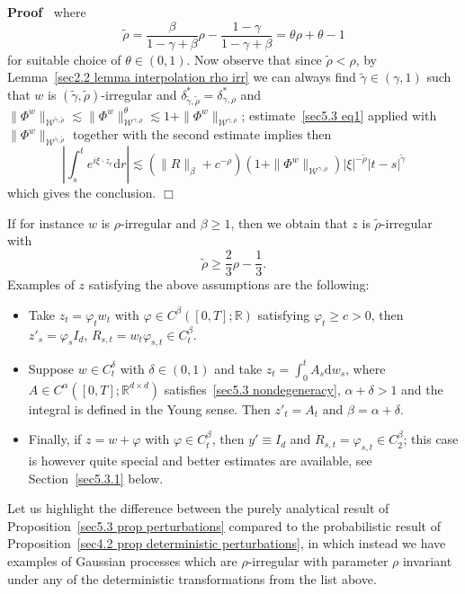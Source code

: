 \documentclass[10pt]{article}
\newcommand{\comma}{{,}}
\newcommand{\mathd}{\mathrm{d}}
\newenvironment{proof}{\noindent\textbf{Proof\ }}{\hspace*{\fill}$\Box$\medskip}
\begin{document}
\begin{proof}
  where
  \[ \tilde{\rho} = \frac{\beta}{1 - \gamma + \beta} \rho - \frac{1 -
     \gamma}{1 - \gamma + \beta} = \theta \rho + \theta - 1 \]
  for suitable choice of $\theta \in (0, 1)$. Now observe that since
  $\tilde{\rho} < \rho$, by Lemma~\ref{sec2.2 lemma interpolation rho irr} we
  can always find $\tilde{\gamma} \in (\gamma, 1)$ such that $w$ is
  $(\tilde{\gamma}, \tilde{\rho})$\mbox{-}irregular and
  $\delta^{\ast}_{\tilde{\gamma}, \tilde{\rho}} = \delta^{\ast}_{\gamma,
  \rho}$ and $\| \Phi^w \|_{\mathcal{W}^{\tilde{\gamma}, \tilde{\rho}}}
  \lesssim \| \Phi^w \|_{\mathcal{W}^{\gamma \comma \rho}}^{\theta} \lesssim 1
  + \| \Phi^w \|_{\mathcal{W}^{\gamma, \rho}}$; estimate~{\eqref{sec5.3 eq1}}
  applied with $\| \Phi^w \|_{\mathcal{W}^{\tilde{\gamma}, \tilde{\rho}}}$
  together with the second estimate implies then
  \[ \left| \int_s^t e^{i \xi \cdot z_r} \mathd r \right| \lesssim (\| R
     \|_{\beta} + c^{- \rho}) (1 + \| \Phi^w \|_{\mathcal{W}^{\gamma, \rho}})
     | \xi |^{- \tilde{\rho}} | t - s |^{\tilde{\gamma}} \]
  which gives the conclusion.
\end{proof}

\begin{remark}
  \label{sec5.3 remark examples}If for instance $w$ is $\rho$\mbox{-}irregular
  and $\beta \geqslant 1$, then we obtain that $z$ is
  $\tilde{\rho}$\mbox{-}irregular with
  \[ \tilde{\rho} \geqslant \frac{2}{3} \rho - \frac{1}{3} . \]
  Examples of $z$ satisfying the above assumptions are the following:
  \begin{itemize}
    \item Take $z_t = \varphi_t w_t$ with $\varphi \in C^{\beta} ([0, T] ;
    \mathbb{R})$ satisfying $\varphi_t \geqslant c > 0$, then $z'_s =
    \varphi_s I_d$, $R_{s, t} = w_t \varphi_{s, t} \in C^{\beta}_t$.
    
    \item Suppose $w \in C^{\delta}_t$ with $\delta \in (0, 1)$ and take $z_t
    = \int_0^t A_s \mathd w_s$, where $A \in C^{\alpha} ([0, T] ;
    \mathbb{R}^{d \times d})$ satisfies~{\eqref{sec5.3 nondegeneracy}},
    $\alpha + \delta > 1$ and the integral is defined in the Young sense. Then
    $z'_t = A_t$ and $\beta = \alpha + \delta$.
    
    \item Finally, if $z = w + \varphi$ with $\varphi \in C^{\beta}_t$, then
    $y' \equiv I_d$ and $R_{s, t} = \varphi_{s, t} \in C_2^{\beta}$; this case
    is however quite special and better estimates are available, see
    Section~\ref{sec5.3.1} below.
  \end{itemize}
  Let us highlight the difference between the purely analytical result of
  Proposition~\ref{sec5.3 prop perturbations} compared to the probabilistic
  result of Proposition~\ref{sec4.2 prop deterministic perturbations}, in
  which instead we have examples of Gaussian processes which are
  $\rho$\mbox{-}irregular with parameter $\rho$ invariant under any of the
  deterministic transformations from the list above.
\end{remark}
\end{document}
